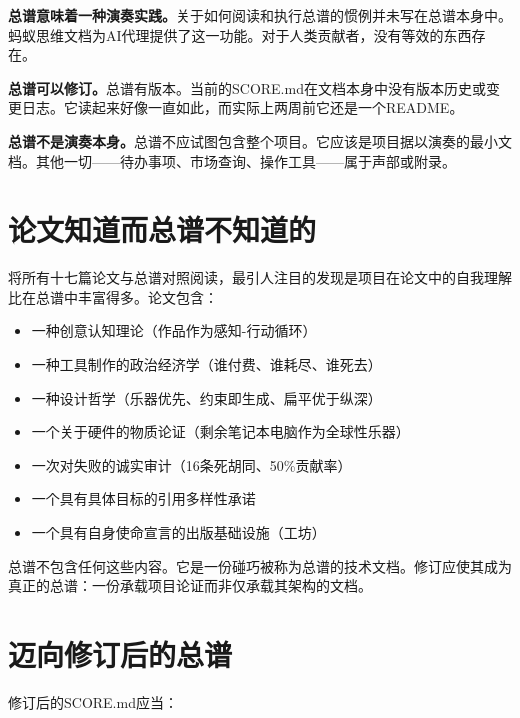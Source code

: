 \documentclass[10pt,letterpaper,twocolumn]{article}
\begin{document}
\textbf{总谱意味着一种演奏实践。}关于如何阅读和执行总谱的惯例并未写在总谱本身中。蚂蚁思维文档为AI代理提供了这一功能。对于人类贡献者，没有等效的东西存在。

\textbf{总谱可以修订。}总谱有版本。当前的SCORE.md在文档本身中没有版本历史或变更日志。它读起来好像一直如此，而实际上两周前它还是一个README。

\textbf{总谱不是演奏本身。}总谱不应试图包含整个项目。它应该是项目据以演奏的最小文档。其他一切——待办事项、市场查询、操作工具——属于声部或附录。

\section{论文知道而总谱不知道的}

将所有十七篇论文与总谱对照阅读，最引人注目的发现是项目在论文中的自我理解比在总谱中丰富得多。论文包含：

\begin{itemize}
\item 一种创意认知理论（作品作为感知-行动循环）
\item 一种工具制作的政治经济学（谁付费、谁耗尽、谁死去）
\item 一种设计哲学（乐器优先、约束即生成、扁平优于纵深）
\item 一个关于硬件的物质论证（剩余笔记本电脑作为全球性乐器）
\item 一次对失败的诚实审计（16条死胡同、50\%贡献率）
\item 一个具有具体目标的引用多样性承诺
\item 一个具有自身使命宣言的出版基础设施（工坊）
\end{itemize}

总谱不包含任何这些内容。它是一份碰巧被称为总谱的技术文档。修订应使其成为真正的总谱：一份承载项目论证而非仅承载其架构的文档。

\section{迈向修订后的总谱}

修订后的SCORE.md应当：
\end{document}
